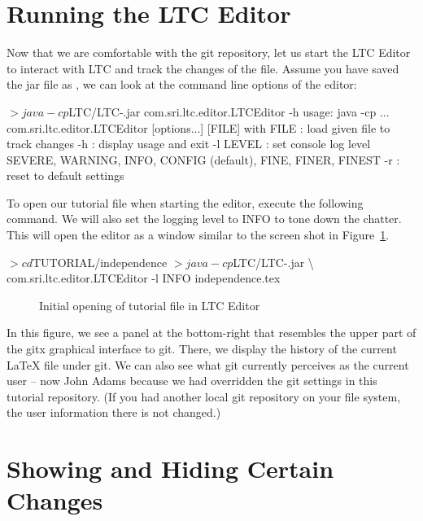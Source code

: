 \section{Running the LTC Editor}

Now that we are comfortable with the git repository, let us start the LTC Editor to interact with LTC and track the changes of the file.  Assume you have saved the jar file as , we can look at the command line options of the editor:
\begin{CodeVerbatim}[commandchars=\\\{\}]
$> java -cp $LTC/LTC-\version.jar com.sri.ltc.editor.LTCEditor -h
usage: java -cp ... com.sri.ltc.editor.LTCEditor [options...] [FILE] 
with
 FILE     : load given file to track changes
 -h       : display usage and exit
 -l LEVEL : set console log level
            SEVERE, WARNING, INFO, CONFIG (default), FINE, FINER, FINEST
 -r       : reset to default settings
\end{CodeVerbatim}

To open our tutorial file when starting the editor, execute the following command.  We will also set the logging level to INFO to tone down the chatter.  This will open the editor as a window similar to the screen shot in Figure~\ref{fig:editor-open}.
\begin{CodeVerbatim}[samepage=true,commandchars=\\\{\}]
$> cd $TUTORIAL/independence
$> java -cp $LTC/LTC-\version.jar \textbackslash
   com.sri.ltc.editor.LTCEditor -l INFO independence.tex
\end{CodeVerbatim}
\begin{figure}[t]
\centering
{}
\caption{Initial opening of tutorial file in LTC Editor} \label{fig:editor-open}
\end{figure}
In this figure, we see a panel at the bottom-right that resembles the upper part of the gitx graphical interface to git.  There, we display the history of the current LaTeX file under git.  We can also see what git currently perceives as the current user -- now John Adams because we had overridden the git settings in this tutorial repository.  (If you had another local git repository on your file system, the user information there is not changed.)

\section{Showing and Hiding Certain Changes}

